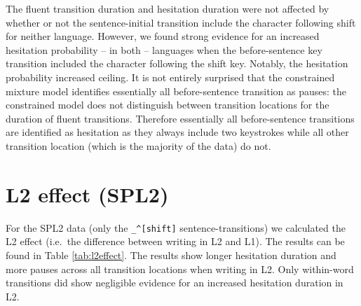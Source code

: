 \documentclass[
  man,floatsintext]{apa7}
\begin{document}
The fluent transition duration and hesitation duration were not affected by whether or not the sentence-initial transition include the character following shift for neither language. However, we found strong evidence for an increased hesitation probability -- in both -- languages when the before-sentence key transition included the character following the shift key. Notably, the hesitation probability increased ceiling. It is not entirely surprised that the constrained mixture model identifies essentially all before-sentence transition as pauses: the constrained model does not distinguish between transition locations for the duration of fluent transitions. Therefore essentially all before-sentence transitions are identified as hesitation as they always include two keystrokes while all other transition location (which is the majority of the data) do not.

\newpage

\hypertarget{l2-effect-spl2}{%
\section{L2 effect (SPL2)}\label{l2-effect-spl2}}

For the SPL2 data (only the \texttt{\_\^{}{[}shift{]}} sentence-transitions) we calculated the L2 effect (i.e.~the difference between writing in L2 and L1). The results can be found in Table \ref{tab:l2effect}. The results show longer hesitation duration and more pauses across all transition locations when writing in L2. Only within-word transitions did show negligible evidence for an increased hesitation duration in L2.
\end{document}
